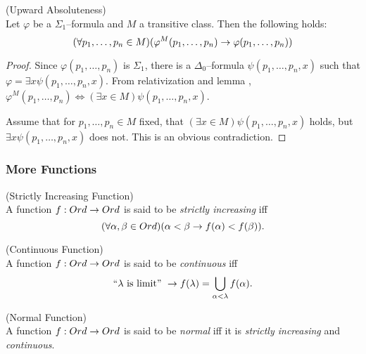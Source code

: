 \begin{lemma}{(Upward Absoluteness)}\label{lemma:upward_absoluteness}\\
Let $\varphi$ be a $\Sigma_1$–formula and $M$ a transitive class. Then the following holds:
\begin{equation}
(\forall p_1, \ldots, p_n \in M)(\varphi^M(p_1, \ldots, p_n) \rightarrow \varphi(p_1, \ldots, p_n))
\end{equation}
\end{lemma}
\begin{proof}
Since $\varphi(p_1, \ldots, p_n)$ is $\Sigma_1$, there is a $\Delta_0$–formula $\psi(p_1, \ldots, p_n, x)$ such that $\varphi = \exists x \psi(p_1, \ldots, p_n, x)$. 
From relativization and lemma , $\varphi^M(p_1, \ldots, p_n) \iff (\exists x \in M)\psi(p_1, \ldots, p_n, x)$.

Assume that for $p_1, \ldots, p_n \in M$ fixed, that $(\exists x \in M)\psi(p_1, \ldots, p_n, x)$ holds, but $\exists x \psi(p_1, \ldots, p_n, x)$ does not. This is an obvious contradiction.
\end{proof}


\subsubsection{More Functions}

\begin{definition}{(Strictly Increasing Function)}\label{def:increasing_function}\\
A function $f: Ord \rightarrow Ord$ is said to be \emph{strictly increasing} iff
\begin{equation}
(\forall \alpha, \beta \in Ord) (\alpha < \beta \rightarrow f(\alpha) < f(\beta)).
\end{equation}
\end{definition}

\begin{definition}{(Continuous Function)}\label{def:continuous_function}\\
A function $f: Ord \rightarrow Ord$ is said to be \emph{continuous} iff
\begin{equation}
\mbox{``}\lambda\mbox{ is limit'' } \rightarrow f(\lambda) = \bigcup_{\alpha < \lambda} f(\alpha).
\end{equation}
\end{definition}

\begin{definition}{(Normal Function)}\label{def:normal_function}\\
A function $f: Ord \rightarrow Ord$ is said to be \emph{normal} iff it is \emph{strictly increasing} and \emph{continuous}.
\end{definition}

